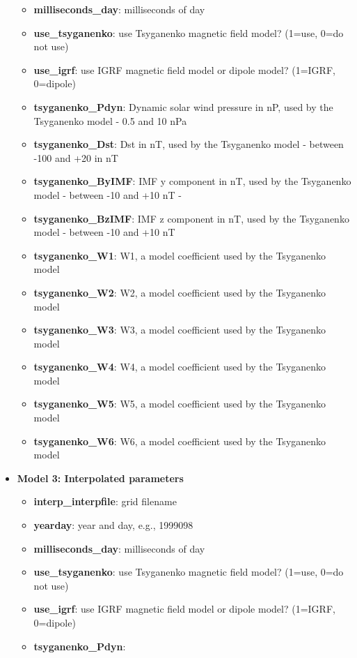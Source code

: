 \documentclass[10pt]{article}
\begin{document}
\begin{itemize}
\begin{itemize}
    \item{\bf milliseconds\_day}:
      milliseconds of day
    \item{\bf use\_tsyganenko}:
      use Tsyganenko magnetic field model? (1=use, 0=do not use)
    \item{\bf use\_igrf}:
      use IGRF magnetic field model or dipole model? (1=IGRF, 0=dipole)
    \item{\bf tsyganenko\_Pdyn}:
      Dynamic solar wind pressure in nP, used by the Tsyganenko model
      - 0.5 and 10 nPa
    \item{\bf tsyganenko\_Dst}:
      Dst in nT, used by the Tsyganenko model - between -100 and +20 in nT
    \item{\bf tsyganenko\_ByIMF}:
      IMF y component in nT, used by the Tsyganenko model - between
      -10 and +10 nT -
    \item{\bf tsyganenko\_BzIMF}:
      IMF z component in nT, used by the Tsyganenko model - between
      -10 and +10 nT
    \item{\bf tsyganenko\_W1}:
      W1, a model coefficient used by the Tsyganenko model
    \item{\bf tsyganenko\_W2}:
      W2, a model coefficient used by the Tsyganenko model
    \item{\bf tsyganenko\_W3}:
      W3, a model coefficient used by the Tsyganenko model
    \item{\bf tsyganenko\_W4}:
      W4, a model coefficient used by the Tsyganenko model
    \item{\bf tsyganenko\_W5}:
      W5, a model coefficient used by the Tsyganenko model
    \item{\bf tsyganenko\_W6}:
      W6, a model coefficient used by the Tsyganenko model
    \end{itemize}
  \item{\bf Model 3: Interpolated parameters}
    \begin{itemize}
    \item{\bf interp\_interpfile}:
      grid filename
    \item{\bf yearday}:
      year and day, e.g., 1999098
    \item{\bf milliseconds\_day}:
      milliseconds of day
    \item{\bf use\_tsyganenko}:
      use Tsyganenko magnetic field model? (1=use, 0=do not use)
    \item{\bf use\_igrf}:
      use IGRF magnetic field model or dipole model? (1=IGRF, 0=dipole)
    \item{\bf tsyganenko\_Pdyn}:

\end{itemize}
\end{itemize}
\end{document}
